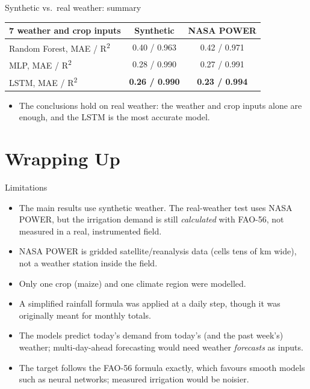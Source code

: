 \documentclass[11pt,aspectratio=169]{beamer}
\begin{document}
\begin{frame}{Synthetic vs.\ real weather: summary}
  \begin{table}
    \centering
    \small
    \begin{tabular}{lcc}
      \toprule
      \textbf{7 weather and crop inputs} & \textbf{Synthetic} & \textbf{NASA POWER} \\
      \midrule
      Random Forest, MAE / R\textsuperscript{2} & 0.40 / 0.963 & 0.42 / 0.971 \\
      MLP, MAE / R\textsuperscript{2} & 0.28 / 0.990 & 0.27 / 0.991 \\
      LSTM, MAE / R\textsuperscript{2} & \textbf{0.26 / 0.990} & \textbf{0.23 / 0.994} \\
      \bottomrule
    \end{tabular}
  \end{table}
  \begin{itemize}
    \item The conclusions \alert{hold on real weather}: the weather and crop
      inputs alone are enough, and the LSTM is the most accurate model.
  \end{itemize}
\end{frame}

\section{Wrapping Up}

\begin{frame}{Limitations}
  \begin{itemize}
    \item The main results use synthetic weather. The real-weather test uses
      NASA POWER, but the irrigation demand is still \emph{calculated} with
      FAO-56, not measured in a real, instrumented field.
    \item NASA POWER is gridded satellite/reanalysis data (cells tens of km
      wide), not a weather station inside the field.
    \item Only one crop (maize) and one climate region were modelled.
    \item A simplified rainfall formula was applied at a daily step, though it
      was originally meant for monthly totals.
    \item The models predict today's demand from today's (and the past
      week's) weather; multi-day-ahead forecasting would need weather
      \emph{forecasts} as inputs.
    \item The target follows the FAO-56 formula exactly, which favours smooth
      models such as neural networks; measured irrigation would be noisier.
  \end{itemize}
\end{frame}
\end{document}
